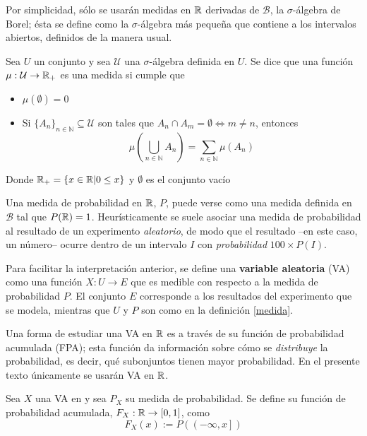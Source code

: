 Por simplicidad, sólo se usarán medidas en $\mathbb{R}$ derivadas de $\mathcal{B}$, la $\sigma$-álgebra de 
Borel; ésta se define como la $\sigma$-álgebra más pequeña que contiene a los intervalos abiertos, 
definidos de la manera usual. 

\begin{definicion}[Medida]
Sea $U$ un conjunto y sea $\mathcal{U}$ una $\sigma$-álgebra definida en $U$. Se dice que una 
función $\mu : \mathcal{U} \rightarrow \mathbb{R}_+$ es una medida si cumple que
\begin{itemize}
\item $\mu(\emptyset) = 0$
\item Si $\{ A_n \}_{n\in \mathbb{N}} \subseteq \mathcal{U}$ son tales que 
$A_n \cap A_m = \emptyset \Leftrightarrow m\neq n$, entonces
$$ \mu\left( \bigcup_{n\in \mathbb{N}} A_n \right) = \sum_{n\in \mathbb{N}} \mu(A_n)$$
\end{itemize}
Donde $\mathbb{R}_+ = \{ x\in \mathbb{R} | 0 \leq x \}$ y $\emptyset$ es el conjunto vacío
\label{medida}
\end{definicion}

Una medida de probabilidad en $\mathbb{R}$, $P$, puede verse como una medida definida en $\mathcal{B}$ tal
que $P(\mathbb{R}) = 1$. 
%
Heurísticamente se suele asociar una medida de probabilidad al resultado de un experimento 
\textit{aleatorio}, de modo que el resultado --en este caso, un número-- ocurre dentro de un 
intervalo $I$ con \textit{probabilidad} $100 \times P(I)$.

Para facilitar la interpretación anterior, se define una \textbf{variable aleatoria} (VA) como una 
función $X : U \rightarrow E$ que es medible con respecto a la medida de probabilidad $P$.
%
El conjunto $E$ corresponde a los resultados del experimento que se modela, mientras que $U$ y $P$ 
son como en la definición \ref{medida}.

Una forma de estudiar una VA en $\mathbb{R}$ es a través de su función de probabilidad acumulada (FPA);
esta función da información sobre cómo se \textit{distribuye} la probabilidad, es decir, qué
subonjuntos tienen mayor probabilidad. 
%
En el presente texto únicamente se usarán VA en $\mathbb{R}$.

\begin{definicion}
Sea $X$ una VA en y sea $P_X$ su medida de probabilidad. Se define su función de 
probabilidad acumulada, $F_X : \mathbb{R} \rightarrow [0,1]$, como
\begin{equation*}
F_X (x) := P\left( \left(-\infty,x \right] \right)
\end{equation*}
\end{definicion}

